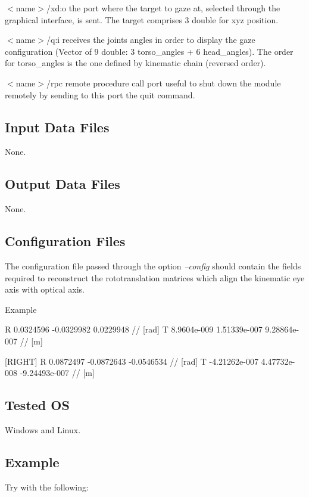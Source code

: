 \begin{DoxyItemize}
\item {\itshape } $<$name$>$/xd\+:o the port where the target to gaze at, selected through the graphical interface, is sent. The target comprises 3 double for xyz position.
\item {\itshape } $<$name$>$/q\+:i receives the joints angles in order to display the gaze configuration (Vector of 9 double\+: 3 torso\+\_\+angles + 6 head\+\_\+angles). The order for torso\+\_\+angles is the one defined by kinematic chain (reversed order).
\item {\itshape } $<$name$>$/rpc remote procedure call port useful to shut down the module remotely by sending to this port the \textquotesingle{}quit\textquotesingle{} command.
\end{DoxyItemize}\hypertarget{group__icub__signalScope_in_files_sec}{}\subsection{Input Data Files}\label{group__icub__signalScope_in_files_sec}
None.\hypertarget{group__icub__signalScope_out_data_sec}{}\subsection{Output Data Files}\label{group__icub__signalScope_out_data_sec}
None.\hypertarget{group__icub__signalScope_conf_file_sec}{}\subsection{Configuration Files}\label{group__icub__signalScope_conf_file_sec}
The configuration file passed through the option {\itshape --config} should contain the fields required to reconstruct the rototranslation matrices which align the kinematic eye axis with optical axis.

Example


\begin{DoxyCode}
[LEFT]
R      0.0324596 -0.0329982 0.0229948               \textcolor{comment}{// [rad]}
T      8.9604e-009 1.51339e-007 9.28864e-007        \textcolor{comment}{// [m]}

[RIGHT]
R      0.0872497 -0.0872643 -0.0546534              \textcolor{comment}{// [rad]}
T      -4.21262e-007 4.47732e-008 -9.24493e-007     \textcolor{comment}{// [m]}
\end{DoxyCode}
\hypertarget{group__icub__signalScope_tested_os_sec}{}\subsection{Tested OS}\label{group__icub__signalScope_tested_os_sec}
Windows and Linux.\hypertarget{group__icub__signalScope_example_sec}{}\subsection{Example}\label{group__icub__signalScope_example_sec}
Try with the following\+:


